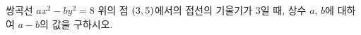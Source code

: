쌍곡선 $ax^2-by^2=8$ 위의 점 $(3{,}\mkern3mu\mathopen{}5)$에서의 접선의 기울기가 $3$일 때, 상수 $a$, $b$에 대하여 $a-b$의 값을 구하시오.
